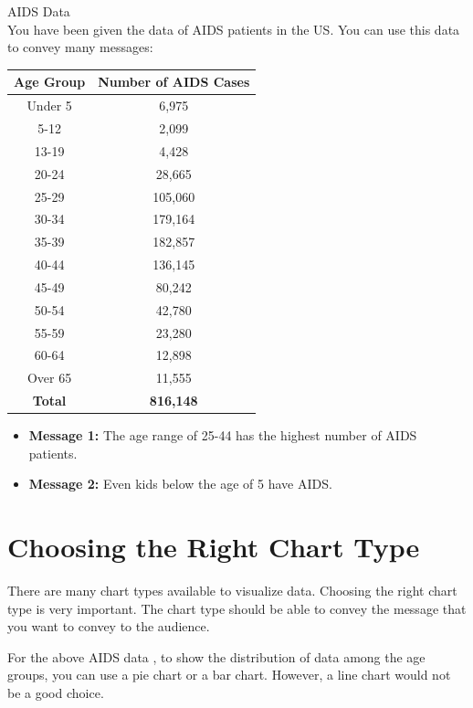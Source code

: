 \documentclass[11pt,fleqn]{book} %
\begin{document}
\begin{example} AIDS Data\\

  You have been given the data of AIDS patients in the US.
  You can use this data to convey many messages:

  \begin{center}
  \begin{tabular}{|c|c|}
    \hline
    \textbf{Age Group} & \textbf{Number of AIDS Cases} \\
    \hline
    Under 5 & 6,975 \\
    5-12 & 2,099 \\
    13-19 & 4,428 \\
    20-24 & 28,665 \\
    25-29 & 105,060 \\
    30-34 & 179,164 \\
    35-39 & 182,857 \\
    40-44 & 136,145 \\
    45-49 & 80,242 \\
    50-54 & 42,780 \\
    55-59 & 23,280 \\
    60-64 & 12,898 \\
    Over 65 & 11,555 \\
    \hline
    \textbf{Total} & \textbf{816,148} \\
    \hline
  \end{tabular}
  \label{tab:aids-data}
  \end{center}


  \begin{itemize}
    \item \textbf{Message 1:} The age range of 25-44 has the highest
  number of AIDS patients.
    \item \textbf{Message 2:} Even kids below the age of 5 have AIDS.
  \end{itemize}


\section{Choosing the Right Chart Type}

There are many chart types available to visualize data.
Choosing the right chart type is very important.
The chart type should be able to convey the message
that you want to convey to the audience.\\

\begin{example}
  For the above AIDS data
  \pageref{tab:aids-data},
  to show the distribution of data
  among the age groups,
  you can use a pie chart or a bar chart.
  However, a line chart would not be a good choice.


\end{example}
\end{example}
\end{document}
